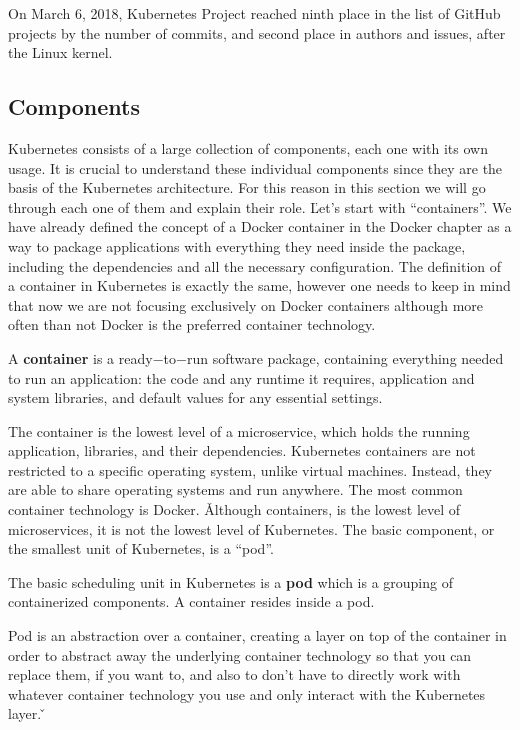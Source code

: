 On March 6, 2018, Kubernetes Project reached ninth place in the list of GitHub projects by the number of commits, and
second place in authors and issues, after the Linux kernel.

\subsection{Components}

Kubernetes consists of a large collection of components, each one with its own usage. It is crucial to understand
these individual components since they are the basis of the Kubernetes architecture. For this reason in this section
we will go through each one of them and explain their role. \v

Let's start with ``containers''. We have already defined the concept of a Docker container in the Docker chapter as a
way to package applications with everything they need inside the package, including the dependencies and all the
necessary configuration. The definition of a container in Kubernetes is exactly the same, however one needs to keep
in mind that now we are not focusing exclusively on Docker containers although more often than not Docker is the
preferred container technology.

\bd[Container]
A \textbf{container} is a ready$-$to$-$run software package, containing everything needed to run an application: the
code and any runtime it requires, application and system libraries, and default values for any essential settings.
\ed


The container is the lowest level of a microservice, which holds the running application, libraries, and their
dependencies. Kubernetes containers are not restricted to a specific operating system, unlike virtual machines.
Instead, they are able to share operating systems and run anywhere. The most common container technology is Docker. \v

Although containers, is the lowest level of microservices, it is not the lowest level of Kubernetes. The basic
component, or the smallest unit of Kubernetes, is a ``pod''.

\bd[Pod]
The basic scheduling unit in Kubernetes is a \textbf{pod} which is a grouping of containerized components. A container
resides inside a pod.
\ed


Pod is an abstraction over a container, creating a layer on top of the container in order to abstract away the
underlying container technology so that you can replace them, if you want to, and also to don't have to directly work
with whatever container technology you use and only interact with the Kubernetes layer. \v

